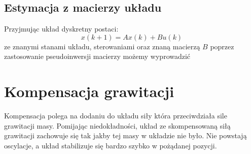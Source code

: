 \documentclass[a4paper]{article}
\begin{document}
\subsection{Estymacja z macierzy układu}
Przyjmując układ dyskretny postaci:
\[x(k+1) = Ax(k) + Bu(k)\]
ze znanymi stanami układu, sterowaniami oraz znaną macierzą $B$ poprzez zastosowanie pseudoinwersji macierzy możemy wyprowadzić 
\section{Kompensacja grawitacji}
Kompensacja polega na dodaniu do układu siły która przeciwdziała sile grawitacji masy. Pomijając niedokładności, układ ze skompensowaną siłą grawitacji zachowuje się tak jakby tej masy w układzie nie było. Nie powstają oscylacje, a układ stabilizuje się bardzo szybko w pożądanej pozycji.
\end{document}
